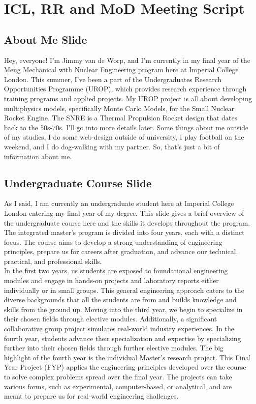 \documentclass[8pt,a5paper]{article}
\begin{document}

\small

\section*{ICL, RR and MoD Meeting Script}

\subsection*{About Me Slide}

Hey, everyone! I'm Jimmy van de Worp, and I'm currently in my final year of the Meng Mechanical with Nuclear Engineering program here at Imperial College London. This summer, I've been a part of the Undergraduates Research Opportunities Programme (UROP), which provides research experience through training programs and applied projects. My UROP project is all about developing multiphysics models, specifically Monte Carlo Models, for the Small Nuclear Rocket Engine. The SNRE is a Thermal Propulsion Rocket design that dates back to the 50s-70s. I'll go into more details later. Some things about me outside of my studies, I do some web-design outside of university, I play football on the weekend, and I do dog-walking with my partner. So, that's just a bit of information about me.

\subsection*{Undergraduate Course Slide}

As I said, I am currently an undergraduate student here at Imperial College London entering my final year of my degree. This slide gives a brief overview of the undergraduate course here and the skills it develops throughout the program. The integrated master's program is divided into four years, each with a distinct focus. The course aims to develop a strong understanding of engineering principles, prepare us for careers after graduation, and advance our technical, practical, and professional skills. \\

In the first two years, us students are exposed to foundational engineering modules and engage in hands-on projects and laboratory reports either individually or in small groups. This general engineering approach caters to the diverse backgrounds that all the students are from and builds knowledge and skills from the ground up. Moving into the third year, we begin to specialize in their chosen fields through elective modules. Additionally, a significant collaborative group project simulates real-world industry experiences. In the fourth year, students advance their specialization and expertise by specializing further into their chosen fields through further elective modules. The big highlight of the fourth year is the individual Master's research project. This Final Year Project (FYP) applies the engineering principles developed over the course to solve complex problems spread over the final year. The projects can take various forms, such as experimental, computer-based, or analytical, and are meant to prepare us for real-world engineering challenges. \\
\end{document}
